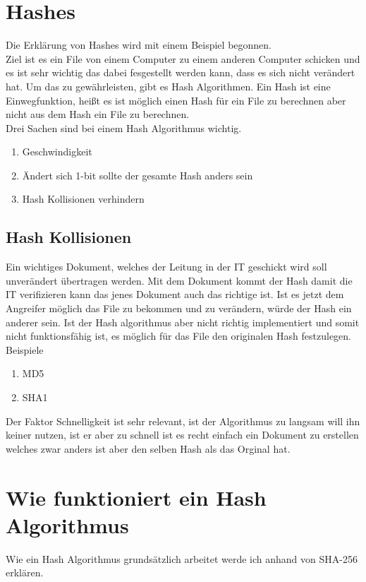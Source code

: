 {\section{Hashes}
\label{hash-expl}
Die Erklärung von Hashes wird mit einem Beispiel begonnen.
\\Ziel ist es ein File von einem Computer zu einem anderen Computer schicken und es ist sehr wichtig das dabei fesgestellt werden kann, dass es sich nicht verändert hat. Um das zu gewährleisten, gibt es Hash Algorithmen. Ein Hash ist eine Einwegfunktion, heißt es ist möglich einen Hash für ein File zu berechnen aber nicht aus dem Hash ein File zu berechnen.\\
Drei Sachen sind bei einem Hash Algorithmus wichtig.
\begin{enumerate}
\item Geschwindigkeit
\item Ändert sich 1-bit sollte der gesamte Hash anders sein
\item Hash Kollisionen verhindern 
\end{enumerate}
\subsection{Hash Kollisionen}
\label{sec:hash_coll}
Ein wichtiges Dokument, welches der Leitung in der IT geschickt wird soll unverändert übertragen werden. Mit dem Dokument kommt der Hash damit die IT verifizieren kann das jenes Dokument auch das richtige ist. Ist es jetzt dem Angreifer möglich das File zu bekommen und zu verändern, würde der Hash ein anderer sein. Ist der Hash algorithmus aber nicht richtig implementiert und somit nicht funktionsfähig ist, es möglich für das File den originalen Hash festzulegen.
\\
Beispiele
\begin{enumerate}
\item MD5
\item SHA1
\end{enumerate}
Der Faktor Schnelligkeit ist sehr relevant, ist der Algorithmus zu langsam will ihn keiner nutzen, ist er aber zu schnell ist es recht einfach ein Dokument zu erstellen welches zwar anders ist aber den selben Hash als das Orginal hat.
\section{Wie funktioniert ein Hash Algorithmus}
\label{sec:hash_algo}
Wie ein Hash Algorithmus grundsätzlich arbeitet werde ich anhand von SHA-256 erklären. 
}
